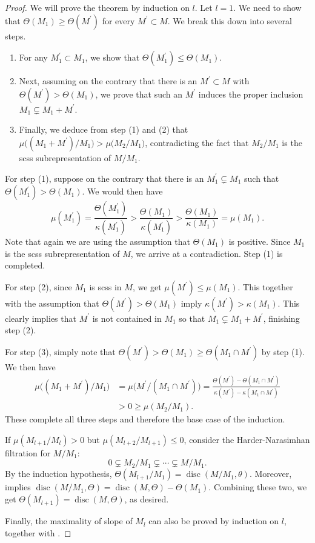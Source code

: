 \documentclass[a4paper]{amsart}
\numberwithin{equation}{section}
\theoremstyle{plain}
\theoremstyle{definition}
\DeclareMathOperator{\disc}{disc}
\begin{document}
\begin{proof}
We will prove the theorem by induction on $l$. Let $l=1$. We need to show that $\Theta(M_{1})\geq \Theta(M^{\prime})$ for every $M^{\prime}\subset M$. We break this down into several steps.
\begin{enumerate}
    \item For any $M^{\prime}_{1}\subset M_{1}$, we show that $\Theta(M_{1}^{\prime})\leq \Theta(M_{1})$. 
    \item Next, assuming on the contrary that there is an $M^{\prime}\subset M$ with $\Theta(M^{\prime})>\Theta(M_{1})$, we prove that such an $M^{\prime}$ induces the proper inclusion $M_{1}\subsetneq M_{1}+M^{\prime}$.
    \item  Finally, we deduce from step (1) and (2) that $\mu\big((M_{1}+M^{\prime})/M_{1})>\mu(M_2/M_{1}\big)$, contradicting the fact that $M_2/M_{1}$ is the scss subrepresentation of $M/M_1$.
\end{enumerate}
For step (1), suppose on the contrary that there is an $M_1^{\prime}\subsetneq M_1$ such that $\Theta(M_1^{\prime})>\Theta(M_1)$. We would then have $$\mu(M_1^{\prime})=\frac{\Theta(M_1^{\prime})}{\kappa(M_1^{\prime})}>\frac{\Theta(M_1)}{\kappa(M_1^{\prime})}> \frac{\Theta(M_1)}{\kappa(M_1)}=\mu(M_1).$$ Note that again we are using the assumption that $\Theta(M_1)$ is positive. Since $M_1$ is the scss subrepresentation of $M$, we arrive at a contradiction.  Step (1) is completed.

For step (2), since $M_{1}$ is scss in $M$, we get $\mu(M^{\prime})\leq \mu(M_{1})$. This together with the assumption that $\Theta(M^{\prime})>\Theta(M_{1})$ imply $\kappa(M^{\prime})>\kappa(M_{1})$. This clearly implies that $M^{\prime}$ is not contained in $M_{1}$ so that $M_{1}\subsetneq M_{1}+M^{\prime}$, finishing step (2).

For step (3), simply note that $\Theta(M^{\prime})>\Theta(M_{1})\geq\Theta(M_{1}\cap M^{\prime})$ by step (1). We then have  
\begin{equation*}\begin{split}\mu\big((M_{1}+M^{\prime})/M_1\big)&=\mu\big(M^{\prime}/(M_{1}\cap M^{\prime})\big)=\frac{\Theta(M^{\prime})-\Theta(M_{1}\cap M^{\prime})}{\kappa(M^{\prime})-\kappa(M_{1}\cap M^{\prime})}\\
&>0\geq \mu(M_2/M_{1}).\end{split}\end{equation*} These complete all three steps and therefore the base case of the induction.

If $\mu(M_{l+1}/M_{l})>0$ but $\mu(M_{l+2}/M_{l+1})\leq 0$, consider the Harder-Narasimhan filtration for $M/M_{1}$: 
$$0\subsetneq M_{2}/M_{1}\subsetneq \cdots\subsetneq M/M_{1}.$$ By the induction hypothesis, $\Theta(M_{l+1}/M_{1})=\disc(M/M_{1},\theta)$. Moreover,  implies $\disc(M/M_1,\Theta)=\disc(M,\Theta)-\Theta(M_1)$. Combining these two, we get $\Theta(M_{l+1})=\disc(M,\Theta)$, as desired. 

Finally, the maximality of slope of $M_l$ can also be proved by induction on $l$, together with .
\end{proof}
\end{document}

